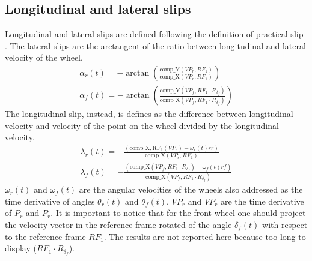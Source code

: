 \subsection{Longitudinal and lateral slips}
%
Longitudinal and lateral slips are defined following the definition of practical slip \cite{lot2004motorcycle,pacejka2006tyre}.
The lateral slips are the arctangent of the ratio between longitudinal and lateral velocity of the wheel. 
%
\begin{equation}
    \begin{array}{l}
        \displaystyle \alpha_r(t) = -\arctan( \frac{ \mathrm{comp\_Y}(VP_r,RF_1) }{\mathrm{comp\_X}(VP_r,RF_1)} )\\
        \displaystyle \alpha_f(t) = -\arctan( \frac{\mathrm{comp\_Y}(VP_f,RF_1\cdot R_{\delta_f})}{\mathrm{comp\_X}(VP_f,RF_1\cdot R_{\delta_f})} )
    \end{array}
\end{equation}
%
The longitudinal slip, instead, is defines as the difference between longitudinal velocity and velocity of the point on the wheel divided by the longitudinal velocity.
%
\begin{equation}
    \begin{array}{l}
        \displaystyle \lambda_r(t) = - \frac{( \mathrm{comp\_X,RF_1}(VP_r)  - \omega_r(t) rr )}{\mathrm{comp\_X}(VP_r,RF_1)}\\  
        \displaystyle \lambda_f(t) = - \frac{( \mathrm{comp\_X}(VP_f,RF_1\cdot R_{\delta_f})  - \omega_f(t) rf )}{\mathrm{comp\_X}(VP_f,RF_1\cdot R_{\delta_f})}
    \end{array}
\end{equation}
%
$\omega_r(t)$ and $\omega_f(t)$ are the angular velocities of the wheels also addressed as the time derivative of angles $\theta_r(t)$ and $\theta_f(t)$. $VP_r$ and $VP_r$ are the time derivative of $P_r$ and $P_r$. 
It is important to notice that for the front wheel one should project the velocity vector in the reference frame rotated of the angle $\delta_f(t)$ with respect to the reference frame $RF_1$. 
The results are not reported here because too long to display ($RF_1\cdot R_{\delta_f}$). 
%